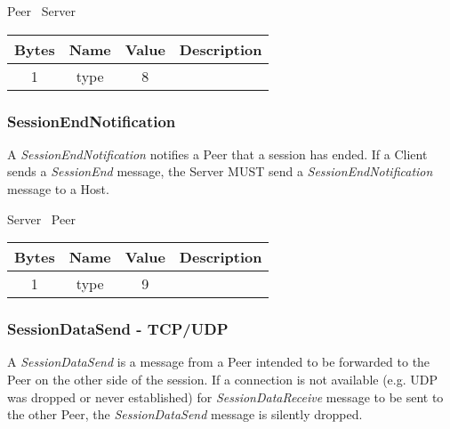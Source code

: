 \documentclass{article}
\begin{document}
    \begin{center}
        Peer \textrightarrow\ Server\\
        \begin{tabular}{|c|c|c|c|}
            \hline
            \textbf{Bytes} & \textbf{Name} & \textbf{Value} & \textbf{Description} \\
            \hline
            1              & type          & 8              &                      \\
            \hline
        \end{tabular}
    \end{center}

    \subsubsection{SessionEndNotification}

    A \emph{SessionEndNotification} notifies a Peer that a session has ended. If a Client sends a \emph{SessionEnd}
    message, the Server MUST send a \emph{SessionEndNotification} message to a Host.

    \begin{center}
        Server \textrightarrow\ Peer\\
        \begin{tabular}{|c|c|c|c|}
            \hline
            \textbf{Bytes} & \textbf{Name} & \textbf{Value} & \textbf{Description} \\
            \hline
            1              & type          & 9              &                      \\
            \hline
        \end{tabular}
    \end{center}

    \subsubsection{SessionDataSend - TCP/UDP}

    A \emph{SessionDataSend} is a message from a Peer intended to be forwarded to the Peer on the other side of the
    session. If a connection is not available (e.g. UDP was dropped or never established) for
    \emph{SessionDataReceive} message to be sent to the other Peer, the
    \emph{SessionDataSend} message is silently dropped.
\end{document}
